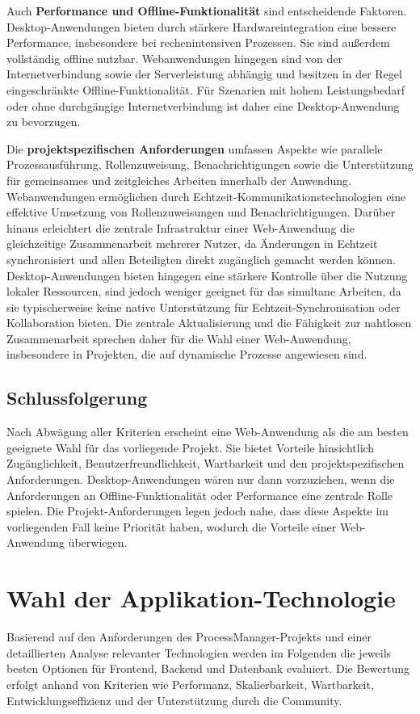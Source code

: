 Auch \textbf{Performance und Offline-Funktionalität} sind entscheidende Faktoren. Desktop-Anwendungen bieten durch stärkere Hardwareintegration eine bessere Performance, insbesondere bei rechenintensiven Prozessen. Sie sind außerdem vollständig offline nutzbar. Webanwendungen hingegen sind von der Internetverbindung sowie der Serverleistung abhängig und besitzen in der Regel eingeschränkte Offline-Funktionalität. Für Szenarien mit hohem Leistungsbedarf oder ohne durchgängige Internetverbindung ist daher eine Desktop-Anwendung zu bevorzugen.

Die \textbf{projektspezifischen Anforderungen} umfassen Aspekte wie parallele Prozessausführung, Rollenzuweisung, Benachrichtigungen sowie die Unterstützung für gemeinsames und zeitgleiches Arbeiten innerhalb der Anwendung. Webanwendungen ermöglichen durch Echtzeit-Kommunikationstechnologien eine effektive Umsetzung von Rollenzuweisungen und Benachrichtigungen. Darüber hinaus erleichtert die zentrale Infrastruktur einer Web-Anwendung die gleichzeitige Zusammenarbeit mehrerer Nutzer, da Änderungen in Echtzeit synchronisiert und allen Beteiligten direkt zugänglich gemacht werden können.
Desktop-Anwendungen bieten hingegen eine stärkere Kontrolle über die Nutzung lokaler Ressourcen, sind jedoch weniger geeignet für das simultane Arbeiten, da sie typischerweise keine native Unterstützung für Echtzeit-Synchronisation oder Kollaboration bieten. Die zentrale Aktualisierung und die Fähigkeit zur nahtlosen Zusammenarbeit sprechen daher für die Wahl einer Web-Anwendung, insbesondere in Projekten, die auf dynamische Prozesse angewiesen sind.

\subsection*{Schlussfolgerung}
Nach Abwägung aller Kriterien erscheint eine Web-Anwendung als die am besten geeignete Wahl für das vorliegende Projekt. Sie bietet Vorteile hinsichtlich Zugänglichkeit, Benutzerfreundlichkeit, Wartbarkeit und den projektspezifischen Anforderungen. Desktop-Anwendungen wären nur dann vorzuziehen, wenn die Anforderungen an Offline-Funktionalität oder Performance eine zentrale Rolle spielen. Die Projekt-Anforderungen legen jedoch nahe, dass diese Aspekte im vorliegenden Fall keine Priorität haben, wodurch die Vorteile einer Web-Anwendung überwiegen.
\cite[Vgl.][]{Mika} \cite[Vgl.][]{Medium} \cite[Vgl.][]{iFour} 

\newpage
\section{Wahl der Applikation-Technologie}
Basierend auf den Anforderungen des ProcessManager-Projekts und einer detaillierten Analyse relevanter Technologien werden im Folgenden die jeweils besten Optionen für Frontend, Backend und Datenbank evaluiert. Die Bewertung erfolgt anhand von Kriterien wie Performanz, Skalierbarkeit, Wartbarkeit, Entwicklungseffizienz und der Unterstützung durch die Community.

